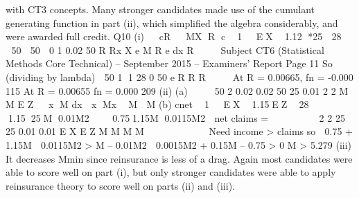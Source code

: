 \documentclass[a4paper,12pt]{article}
\begin{document}
with CT3 concepts. Many stronger candidates made use of the cumulant
generating function in part (ii), which simplified the algebra considerably, and
were awarded full credit.
Q10 (i)   cR   MX R
c  1 EX  1.12 *25  28 
  50  50 
0
1
0.02
50
R
Rx
X
e
M R e dx
R

  
Subject CT6 (Statistical Methods Core Technical) – September 2015 – Examiners’ Report
Page 11
So (dividing by lambda)
 50 1
1 28 0
50
e R
R
R

  
At R = 0.00665, fn = -0.000 115
At R = 0.00655 fn = 0.000 209
(ii) (a)    
50 2
0.02 0.02 50 25 0.01 2
2 M
M
E Z   x M dx  x Mx  M  M
(b) cnet  1 EX  1.15EZ
 28 1.1525M 0.01M2 
 0.751.15M 0.0115M2 
net claims =      
 
2
2
25 25 0.01
0.01
E X E Z M M
M M
     
  
Need income > claims so
 0.75 + 1.15M  0.0115M2 > M – 0.01M2
 0.0015M2 + 0.15M – 0.75 > 0
M > 5.279
(iii) It decreases Mmin since reinsurance is less of a drag.
Again most candidates were able to score well on part (i), but only stronger
candidates were able to apply reinsurance theory to score well on parts (ii)
and (iii).
\end{document}
